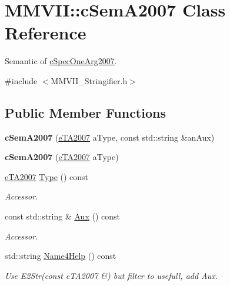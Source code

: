 \hypertarget{classMMVII_1_1cSemA2007}{}\section{M\+M\+V\+II\+:\+:c\+Sem\+A2007 Class Reference}
\label{classMMVII_1_1cSemA2007}


Semantic of \hyperlink{classMMVII_1_1cSpecOneArg2007}{c\+Spec\+One\+Arg2007}.  




{\ttfamily \#include $<$M\+M\+V\+I\+I\+\_\+\+Stringifier.\+h$>$}

\subsection*{Public Member Functions}
\begin{DoxyCompactItemize}
\item 
{\bfseries c\+Sem\+A2007} (\hyperlink{MMVII__enums_8h_a9d431a971072a6c440012f6325f616ad}{e\+T\+A2007} a\+Type, const std\+::string \&an\+Aux)\hypertarget{classMMVII_1_1cSemA2007_a8727fc77c676fe806a2da32263d8e29d}{}\label{classMMVII_1_1cSemA2007_a8727fc77c676fe806a2da32263d8e29d}

\item 
{\bfseries c\+Sem\+A2007} (\hyperlink{MMVII__enums_8h_a9d431a971072a6c440012f6325f616ad}{e\+T\+A2007} a\+Type)\hypertarget{classMMVII_1_1cSemA2007_a4bb195e67cd1a04b6abe826174278e51}{}\label{classMMVII_1_1cSemA2007_a4bb195e67cd1a04b6abe826174278e51}

\item 
\hyperlink{MMVII__enums_8h_a9d431a971072a6c440012f6325f616ad}{e\+T\+A2007} \hyperlink{classMMVII_1_1cSemA2007_aef65409d24b86099db9e712796381e67}{Type} () const \hypertarget{classMMVII_1_1cSemA2007_aef65409d24b86099db9e712796381e67}{}\label{classMMVII_1_1cSemA2007_aef65409d24b86099db9e712796381e67}

\begin{DoxyCompactList}\small\item\em Accessor. \end{DoxyCompactList}\item 
const std\+::string \& \hyperlink{classMMVII_1_1cSemA2007_a7d636b7c93c610f0ed5493059de15d58}{Aux} () const \hypertarget{classMMVII_1_1cSemA2007_a7d636b7c93c610f0ed5493059de15d58}{}\label{classMMVII_1_1cSemA2007_a7d636b7c93c610f0ed5493059de15d58}

\begin{DoxyCompactList}\small\item\em Accessor. \end{DoxyCompactList}\item 
std\+::string \hyperlink{classMMVII_1_1cSemA2007_a38f6323907c34de376d1ca6398c4325f}{Name4\+Help} () const \hypertarget{classMMVII_1_1cSemA2007_a38f6323907c34de376d1ca6398c4325f}{}\label{classMMVII_1_1cSemA2007_a38f6323907c34de376d1ca6398c4325f}

\begin{DoxyCompactList}\small\item\em Use E2\+Str(const e\+T\+A2007 \&) but filter to usefull, add Aux. \end{DoxyCompactList}\end{DoxyCompactItemize}
